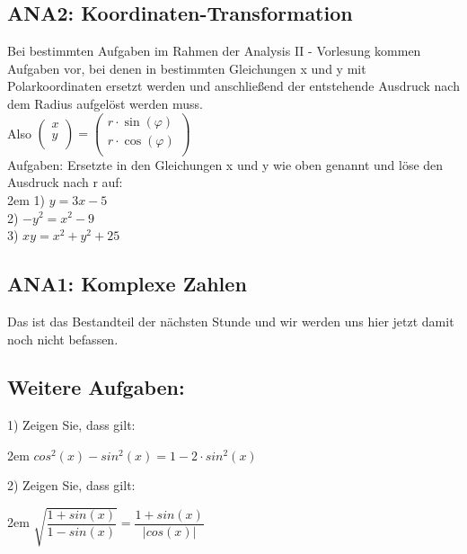 \documentclass[11pt,final]{scrreprt}
\newcommand{\gbr} {\bigskip\\}
\begin{document}
\subsection{ANA2: Koordinaten-Transformation}

Bei bestimmten Aufgaben im Rahmen der Analysis II - Vorlesung kommen Aufgaben vor, bei denen in bestimmten Gleichungen x und y mit Polarkoordinaten ersetzt werden und anschließend der entstehende Ausdruck nach dem Radius aufgelöst werden muss.\\
Also $\left(\begin{matrix}x\\y\\\end{matrix}\right) = \left(\begin{matrix}r\cdot\sin(\varphi)\\r\cdot\cos(\varphi)\\\end{matrix}\right)$\gbr
Aufgaben: Ersetzte in den Gleichungen x und y wie oben genannt und löse den Ausdruck nach r auf:\\

\begingroup
\leftskip2em 
1) $y=3x-5$\\
2) $-y^2 = x^2-9$\\
3) $xy = x^2+y^2+25$\\
\par	
\endgroup 

\subsection{ANA1: Komplexe Zahlen}

Das ist das Bestandteil der nächsten Stunde und wir werden uns hier jetzt damit noch nicht befassen.\\

\subsection{Weitere Aufgaben:}

1) Zeigen Sie, dass gilt:

\begingroup
\leftskip2em 
$ cos^2(x)-sin^2(x) = 1-2\cdot sin^2(x) $\\
\par	
\endgroup 

2) Zeigen Sie, dass gilt:

\begingroup
\leftskip2em 
$ \sqrt{\dfrac{1+sin(x)}{1-sin(x)}} = \dfrac{1+sin(x)}{|cos(x)|} $\\
\par	
\endgroup 
\end{document}
